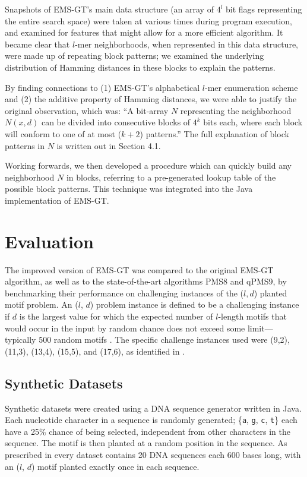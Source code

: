 \documentclass[oneside,12pt]{DISCSthesis}
\begin{document}
{		Snapshots of EMS-GT's main data structure (an array of $4^l$ bit flags representing the entire search space) were taken at various times during program execution, and examined for features that might allow for a more efficient algorithm. It became clear that $l$-mer neighborhoods, when represented in this data structure, were made up of repeating block patterns; we examined the underlying distribution of Hamming distances in these blocks to explain the patterns.

		By finding connections to (1) EMS-GT's alphabetical $l$-mer enumeration scheme and (2) the additive property of Hamming distances, we were able to justify the original observation, which was: ``A bit-array $N$ representing the neighborhood $N(x,d)$ can be divided into consecutive blocks of $4^k$ bits each, where each block will conform to one of at most ($k+2$) patterns.'' The full explanation of block patterns in $N$ is written out in Section 4.1.
		
		Working forwards, we then developed a procedure which can quickly build any neighborhood $N$ in blocks, referring to a pre-generated lookup table of the possible block patterns. This technique was integrated into the Java implementation of EMS-GT.

	\section{Evaluation}
		The improved version of EMS-GT was compared to the original EMS-GT algorithm, as well as to the state-of-the-art algorithms PMS8 and qPMS9, by benchmarking their performance on challenging instances of the ($l, d$) planted motif problem. An ($l$, $d$) problem instance is defined to be a challenging instance if $d$ is the largest value for which the expected number of $l$-length motifs that would occur in the input by random chance does not exceed some limit---typically 500 random motifs \cite{pms2015}. The specific challenge instances used were (9,2), (11,3), (13,4), (15,5), and (17,6), as identified in \cite{pms2015,pms2007}. 

		\subsection{Synthetic Datasets}
			Synthetic datasets were created using a DNA sequence generator written in Java. Each nucleotide character in a sequence is randomly generated; \{\texttt{a}, \texttt{g}, \texttt{c}, \texttt{t}\} each have a 25\% chance of being selected, independent from other characters in the sequence.
			The motif is then planted at a random position in the sequence. As prescribed in \cite{pevzner2000combinatorial} every dataset contains 20 DNA sequences each 600 bases long, with an ($l$, $d$) motif planted exactly once in each sequence.

}
\end{document}
